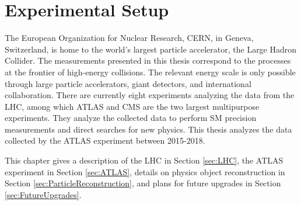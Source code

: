 \part{\LARGE{Experimental Setup}}
\label{sec:Experiment}

The European Organization for Nuclear Research, CERN, in Geneva, Switzerland, is home to the world's largest particle accelerator, the Large Hadron Collider. The measurements presented in this thesis correspond to the processes at the frontier of high-energy collisions. The relevant energy scale is only possible through large particle accelerators, giant detectors, and international collaboration. There are currently eight experiments analyzing the data from the LHC, among which ATLAS and CMS are the two largest multipurpose experiments. They analyze the collected data to perform SM precision measurements and direct searches for new physics. This thesis analyzes the data collected by the ATLAS experiment between 2015-2018.

This chapter gives a description of the LHC in Section \ref{sec:LHC}, the ATLAS experiment in Section \ref{sec:ATLAS}, details on physics object reconstruction in Section \ref{sec:ParticleReconstruction}, and plans for future upgrades in Section \ref{sec:FutureUpgrades}. 